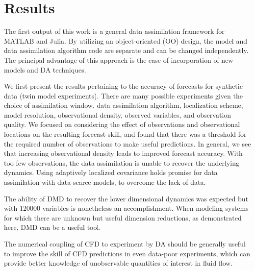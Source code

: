 \section{Results}

The first output of this work is a general data assimilation framework for MATLAB and Julia.
By utilizing an object-oriented (OO) design, the model and data assimilation algorithm code are separate and can be changed independently.
The principal advantage of this approach is the ease of incorporation of new models and DA techniques.

We first present the results pertaining to the accuracy of forecasts for synthetic data (twin model experiments).
There are many possible experiments given the choice of assimilation window, data assimilation algorithm, localization scheme, model resolution, observational density, observed variables, and observation quality.
We focused on considering the effect of observations and observational locations on the resulting forecast skill, and found that there was a threshold for the required number of observations to make useful predictions.
In general, we see that increasing observational density leads to improved forecast accuracy.
With too few observations, the data assimilation is unable to recover the underlying dynamics.
Using adaptively localized covariance holds promise for data assimilation with data-scarce models, to overcome the lack of data.

The ability of DMD to recover the lower dimensional dynamics was expected but with 120000 variables is nonetheless an accomplishment.
When modeling systems for which there are unknown but useful dimension reductions, as demonstrated here, DMD can be a useful tool.

The numerical coupling of CFD to experiment by DA should be generally useful to improve the skill of CFD predictions in even data-poor experiments, which can provide better knowledge of unobservable quantities of interest in fluid flow.


